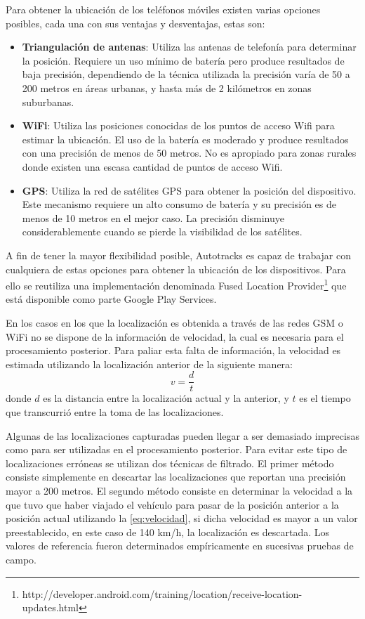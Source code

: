Para obtener la ubicación de los teléfonos móviles existen varias opciones posibles, cada una con sus ventajas y desventajas, estas son: 
\begin{itemize}
\item \textbf{Triangulación de antenas}: Utiliza las antenas de telefonía para determinar la posición. Requiere un uso mínimo de batería pero produce resultados de baja precisión, dependiendo de la técnica utilizada la precisión varía de 50 a 200 metros en áreas urbanas, y hasta más de 2 kilómetros en zonas suburbanas.
\item \textbf{WiFi}: Utiliza las posiciones conocidas de los puntos de acceso Wifi para estimar la ubicación. El uso de la batería es moderado y produce resultados con una precisión de menos de 50 metros. No es apropiado para zonas rurales donde existen una escasa cantidad de puntos de acceso Wifi.
\item \textbf{GPS}: Utiliza la red de satélites GPS para obtener la posición del dispositivo. Este mecanismo requiere un alto consumo de batería y su precisión es de menos de 10 metros en el mejor caso. La precisión disminuye considerablemente cuando se pierde la visibilidad de los satélites.
\end{itemize}
A fin de tener la mayor flexibilidad posible, Autotracks es capaz de trabajar con cualquiera de estas opciones para obtener la ubicación de los dispositivos. Para ello se reutiliza una implementación denominada Fused Location Provider\footnote{http://developer.android.com/training/location/receive-location-updates.html} que está disponible como parte Google Play Services.

En los casos en los que la localización es obtenida a través de las redes GSM o WiFi no se dispone de la información de velocidad, la cual es necesaria para el procesamiento posterior. Para paliar esta falta de información, la velocidad es estimada utilizando la localización anterior de la siguiente manera: \begin{equation} \label{eq:velocidad} v=\frac { d }{ t } \end{equation} donde $d$ es la distancia entre la localización actual y la anterior, y $t$ es el tiempo que transcurrió entre la toma de las localizaciones.

Algunas de las localizaciones capturadas pueden llegar a ser demasiado imprecisas como para ser utilizadas en el procesamiento posterior. Para evitar este tipo de localizaciones erróneas se utilizan dos técnicas de filtrado. El primer método consiste simplemente en descartar las localizaciones que reportan una precisión mayor a 200 metros. El segundo método consiste en determinar la velocidad a la que tuvo que haber viajado el vehículo para pasar de la posición anterior a la posición actual utilizando la \cref{eq:velocidad}, si dicha velocidad es mayor a un valor preestablecido, en este caso de 140 km/h, la localización es descartada. Los valores de referencia fueron determinados empíricamente en sucesivas pruebas de campo.

